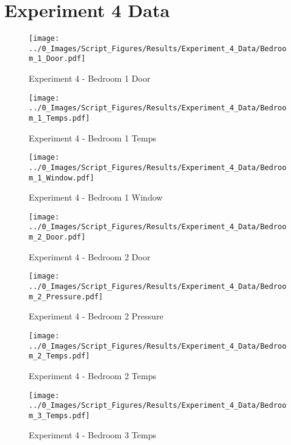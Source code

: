 	\clearpage

\clearpage		\large
\section{Experiment 4 Data} \label{App:Exp4Results} 

	\begin{figure}[H]
		\centering
		\texttt{[image: ../0\_Images/Script\_Figures/Results/Experiment\_4\_Data/Bedroom\_1\_Door.pdf]}
		\caption[]{Experiment 4 - Bedroom 1 Door}
	\end{figure}
 

	\begin{figure}[H]
		\centering
		\texttt{[image: ../0\_Images/Script\_Figures/Results/Experiment\_4\_Data/Bedroom\_1\_Temps.pdf]}
		\caption[]{Experiment 4 - Bedroom 1 Temps}
	\end{figure}
 
	\clearpage

	\begin{figure}[H]
		\centering
		\texttt{[image: ../0\_Images/Script\_Figures/Results/Experiment\_4\_Data/Bedroom\_1\_Window.pdf]}
		\caption[]{Experiment 4 - Bedroom 1 Window}
	\end{figure}
 

	\begin{figure}[H]
		\centering
		\texttt{[image: ../0\_Images/Script\_Figures/Results/Experiment\_4\_Data/Bedroom\_2\_Door.pdf]}
		\caption[]{Experiment 4 - Bedroom 2 Door}
	\end{figure}
 
	\clearpage

	\begin{figure}[H]
		\centering
		\texttt{[image: ../0\_Images/Script\_Figures/Results/Experiment\_4\_Data/Bedroom\_2\_Pressure.pdf]}
		\caption[]{Experiment 4 - Bedroom 2 Pressure}
	\end{figure}
 

	\begin{figure}[H]
		\centering
		\texttt{[image: ../0\_Images/Script\_Figures/Results/Experiment\_4\_Data/Bedroom\_2\_Temps.pdf]}
		\caption[]{Experiment 4 - Bedroom 2 Temps}
	\end{figure}
 
	\clearpage

	\begin{figure}[H]
		\centering
		\texttt{[image: ../0\_Images/Script\_Figures/Results/Experiment\_4\_Data/Bedroom\_3\_Temps.pdf]}
		\caption[]{Experiment 4 - Bedroom 3 Temps}
	\end{figure}
 

